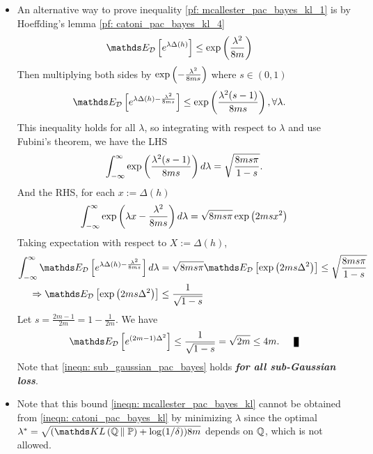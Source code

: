\documentclass[11pt]{article}
\begin{document}
\begin{itemize}
\item \begin{remark}
An alternative way to prove inequality \eqref{pf: mcallester_pac_bayes_kl_1} is by Hoeffding's lemma \eqref{pf: catoni_pac_bayes_kl_4}
\begin{align*}
\E{\cD}{e^{\lambda  \Delta(h)}} &\le \exp\paren{\frac{\lambda^2}{8m}}
\end{align*} Then multiplying both sides by $\exp\left(-\frac{\lambda^2}{8m s}\right)$ where $s \in (0,1)$
\begin{align*}
\E{\cD}{e^{\lambda  \Delta(h) -\frac{\lambda^2}{8m s} }} &\le \exp\paren{\frac{\lambda^2(s-1)}{8ms}}, \forall \lambda.
\end{align*} This inequality holds for all $\lambda$, so integrating with respect to $\lambda$ and use Fubini's theorem, we have the LHS
\begin{align*}
\int_{-\infty}^{\infty}\exp\left(\frac{\lambda^2(s-1)}{8ms}\right)d\lambda = \sqrt{\frac{8ms \pi}{1-s}}.
\end{align*} And the RHS, for each $x:=\Delta(h)$
\begin{align*}
\int_{-\infty}^{\infty}\exp\left(\lambda x -\frac{\lambda^2}{8m s} \right)d\lambda = \sqrt{8ms \pi}\exp\left(2m s x^2\right)
\end{align*} Taking expectation with respect to $X := \Delta(h)$,
\begin{align}
\int_{-\infty}^{\infty}\E{\cD}{e^{\lambda  \Delta(h) -\frac{\lambda^2}{8m s} }} d\lambda &= \sqrt{8ms \pi}\E{\cD}{\exp\paren{2m s\Delta^2}} \le \sqrt{\frac{8ms \pi}{1-s}} \\
\Rightarrow \E{\cD}{\exp\paren{2m s\Delta^2}} &\le \frac{1}{\sqrt{1 - s}} \label{ineqn: sub_gaussian_pac_bayes}
\end{align} Let $s = \frac{2m - 1}{2m}= 1 - \frac{1}{2m}$. We have
\begin{align*}
\E{\cD}{e^{(2m -1)\Delta^2}} \le \frac{1}{\sqrt{1 - s}} = \sqrt{2m} \le 4m. \qed
\end{align*} Note that \eqref{ineqn: sub_gaussian_pac_bayes} holds \emph{\textbf{for all sub-Gaussian loss}}.
\end{remark}

\item \begin{remark}
Note that this bound  \eqref{ineqn: mcallester_pac_bayes_kl} cannot be obtained from \eqref{ineqn: catoni_pac_bayes_kl} by minimizing $\lambda$ since the optimal $\lambda^{*}= \sqrt{(\kl{\bQ}{\bP}  + \log(1/\delta)) 8m}$ depends on ${\mathbb Q}$, which is not allowed. 


\end{remark}
\end{itemize}
\end{document}
